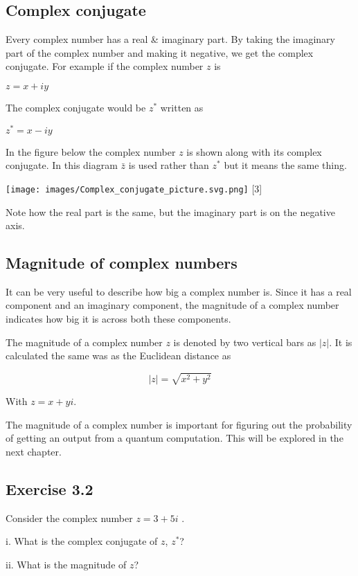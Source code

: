 \documentclass{book}
\begin{document}
\subsection{ Complex conjugate}

Every complex number has a real \& imaginary part. By taking the imaginary part of the complex number and making it negative, we get the complex conjugate. For example if the complex number $z$ is 

$z = x + iy$ 

The complex conjugate would be $z^*$ written as 

$z^* = x - iy$ 

In the figure below the complex number $z$ is shown along with its complex conjugate. In this diagram $\bar{z}$ is used rather than $z^*$ but it means the same thing.  

\texttt{[image: images/Complex\_conjugate\_picture.svg.png]}
 [3]

 Note how the real part is the same, but the imaginary part is on the negative axis. 

 \subsection{ Magnitude of complex numbers }

 It can be very useful to describe how big a complex number is. Since it has a real component and an imaginary component, the magnitude of a complex number indicates how big it is across both these components. 

 The magnitude of a complex number $z$ is denoted by two vertical bars as $|z|$. It is calculated the same was as the Euclidean distance as 

 $$|z| = \sqrt{x^2 + y^2}$$

 With $z = x + yi$. 

 The magnitude of a complex number is important for figuring out the probability of getting an output from a quantum computation. This will be explored in the next chapter.
\hline

\subsection{Exercise 3.2}


Consider the complex number $z = 3 + 5i$ . 

i. What is the complex conjugate of $z$, $z^*$?
 
ii. What is the magnitude of $z$?
\end{document}
